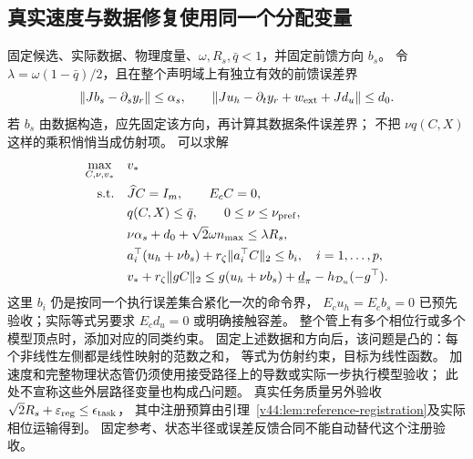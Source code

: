 \documentclass[11pt,a4paper]{article}
\numberwithin{equation}{section}
\theoremstyle{definition}
\begin{document}
\subsection{真实速度与数据修复使用同一个分配变量}
固定候选、实际数据、物理度量、$\omega,R_s,\bar q<1$，并固定前馈方向 $b_s$。
令 $\lambda=\omega(1-\bar q)/2$，且在整个声明域上有独立有效的前馈误差界
\begin{equation}
 \|Jb_s-\partial_s y_r\|\le\alpha_s,
 \qquad
 \|Ju_h-\partial_t y_r+w_{\rm ext}+Jd_u\|\le d_0.
\end{equation}
若 $b_s$ 由数据构造，应先固定该方向，再计算其数据条件误差界；
不把 $\nu q(C,X)$ 这样的乘积悄悄当成仿射项。
可以求解
\begin{equation}
\begin{aligned}
 \max_{C,\nu,v_*}\quad &v_*\\
 \text{s.t.}\quad
 &\widehat JC=I_m,\qquad E_cC=0,\\
 &q(C,X)\le\bar q,\qquad 0\le\nu\le\nu_{\rm pref},\\
 &\nu\alpha_s+d_0+\sqrt2\omega n_{\max}\le\lambda R_s,\\
 &a_i^\top(u_h+\nu b_s)+r_\zeta\|a_i^\top C\|_2\le b_i,
       \quad i=1,\ldots,p,\\
 &v_*+r_\zeta\|gC\|_2
   \le g(u_h+\nu b_s)+\underline d_\pi-h_{\mathcal D_u}(-g^\top).
 \label{v44:eq:joint-real-progress-program}
\end{aligned}
\end{equation}
这里 $b_i$ 仍是按同一个执行误差集合紧化一次的命令界，
$E_cu_h=E_cb_s=0$ 已预先验收；实际等式另要求 $E_cd_u=0$ 或明确接触容差。
整个管上有多个相位行或多个模型顶点时，添加对应的同类约束。
固定上述数据和方向后，该问题是凸的：每个非线性左侧都是线性映射的范数之和，
等式为仿射约束，目标为线性函数。
加速度和完整物理状态管仍须使用接受路径上的导数或实际一步执行模型验收；
此处不宣称这些外层路径变量也构成凸问题。
真实任务质量另外验收
$\sqrt2R_s+\varepsilon_{\rm reg}\le\epsilon_{\rm task}$，
其中注册预算由引理~\ref{v44:lem:reference-registration}及实际相位运输得到。
固定参考、状态半径或误差反馈合同不能自动替代这个注册验收。
\end{document}

